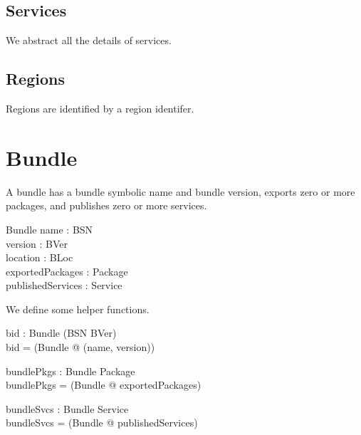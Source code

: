 \documentclass[a4paper,9pt]{article}
\begin{document}
\subsection*{Services}

We abstract all the details of services.
\begin{zed}
  [Service]
\end{zed}

\subsection*{Regions}

Regions are identified by a region identifer.
\begin{zed}
  [RId]
\end{zed}

\clearpage
\section{Bundle}
\label{cha:bundle}

A bundle has a bundle symbolic name and bundle version, exports zero or more packages, and
publishes zero or more services.

\begin{schema}{Bundle}
  name : BSN \\
  version : BVer \\
  location : BLoc \\
  exportedPackages : \power Package \\
  publishedServices : \power Service \\
\end{schema}

We define some helper functions.
\begin{axdef}
  bid : Bundle \fun (BSN \cross BVer) \\
\where
  bid =  (\lambda Bundle @ (name, version)) \\
\end{axdef}
\begin{axdef}
  bundlePkgs : Bundle \fun \power Package \\
\where
 bundlePkgs = (\lambda Bundle @ exportedPackages) \\
\end{axdef}
\begin{axdef}
  bundleSvcs : Bundle \fun \power Service \\
\where
 bundleSvcs = (\lambda Bundle @ publishedServices) \\
\end{axdef}
\end{document}
